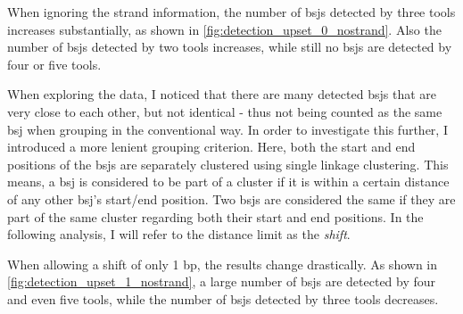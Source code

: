 When ignoring the strand information, the number of \gls{bsj}s detected by
three tools increases substantially, as shown in
\cref{fig:detection_upset_0_nostrand}.
Also the number of \gls{bsj}s detected by two tools increases, while still no
\gls{bsj}s are detected by four or five tools.

When exploring the data, I noticed that there are many detected \gls{bsj}s that
are very close to each other, but not identical - thus not being counted as the
same \gls{bsj} when grouping in the conventional way.
In order to investigate this further, I introduced a more lenient grouping
criterion.
Here, both the start and end positions of the \gls{bsj}s are separately
clustered using single linkage clustering.
This means, a \gls{bsj} is considered to be part of a cluster if it is within a
certain distance of any other \gls{bsj}'s start/end position.
Two \gls{bsj}s are considered the same if they are part of the same cluster
regarding both their start and end positions.
In the following analysis, I will refer to the distance limit as the
\textit{shift}.

When allowing a shift of only 1 bp, the results change drastically.
As shown in \cref{fig:detection_upset_1_nostrand}, a large number of \gls{bsj}s
are detected by four and even five tools, while the number of \gls{bsj}s
detected by three tools decreases.

